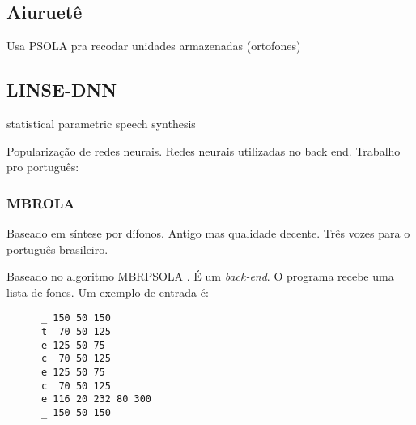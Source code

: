 \subsection{Aiuruetê}
Usa PSOLA pra recodar unidades armazenadas (ortofones)
\subsection{LINSE-DNN}
statistical parametric speech synthesis

Popularização de redes neurais.
Redes neurais utilizadas no back end.
Trabalho pro português: \cite{dnnpt}

\subsubsection{MBROLA}
Baseado em síntese por dífonos. Antigo mas qualidade decente. Três vozes para o
português brasileiro. \cite{mbrola} %

Baseado no algoritmo {MBRPSOLA} \cite{mbrpsola}. É um \emph{back-end}. O programa recebe uma lista de fones. Um exemplo de entrada é:

\begin{lstlisting}
      _ 150 50 150
      t  70 50 125
      e 125 50 75
      c  70 50 125
      e 125 50 75
      c  70 50 125
      e 116 20 232 80 300
      _ 150 50 150
\end{lstlisting}

